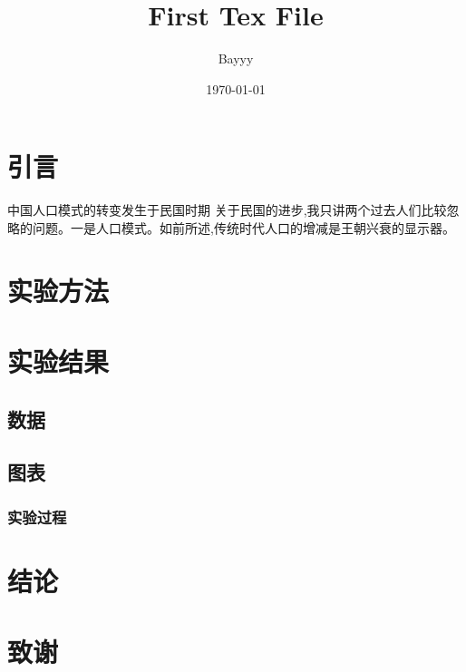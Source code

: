 \documentclass{ctexart}
\title{First Tex File}
\author{Bayyy}
\date{\today}
\begin{document}
	\maketitle	%
	
	\section{引言}
	中国人口模式的转变发生于民国时期 关于民国的进步,我只讲两个过去人们比较忽略的问题。一是人口模式。如前所述,传统时代人口的增减是王朝兴衰的显示器。
	\section{实验方法}
	\section{实验结果}
	\subsection{数据}
	\subsection{图表}
	\subsubsection{实验过程}
	\section{结论}
	\section{致谢}	
	
\end{document}
